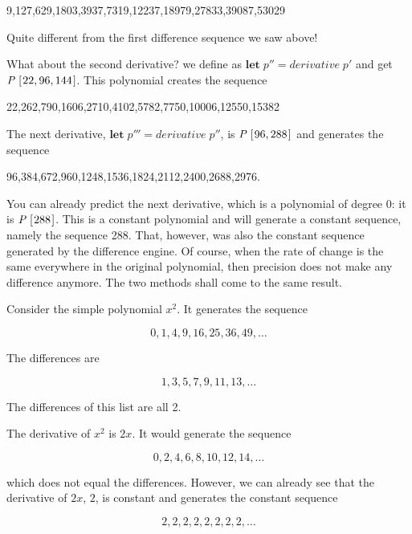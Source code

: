 \documentclass[tikz]{scrreprt}
\newcommand{\Conid}[1]{\mathit{#1}}
\newcommand{\Varid}[1]{\mathit{#1}}
\begin{document}
9,127,629,1803,3937,7319,12237,18979,27833,39087,53029

Quite different from the first difference sequence we saw above!

What about the second derivative? we define as
\ensuremath{\mathbf{let}\;\Varid{p''}\mathrel{=}\Varid{derivative}\;\Varid{p'}} and get \ensuremath{\Conid{P}\;[\mskip1.5mu \mathrm{22},\mathrm{96},\mathrm{144}\mskip1.5mu]}.
This polynomial creates the sequence

22,262,790,1606,2710,4102,5782,7750,10006,12550,15382

The next derivative, \ensuremath{\mathbf{let}\;\Varid{p'''}\mathrel{=}\Varid{derivative}\;\Varid{p''}},
is \ensuremath{\Conid{P}\;[\mskip1.5mu \mathrm{96},\mathrm{288}\mskip1.5mu]} and generates the sequence

96,384,672,960,1248,1536,1824,2112,2400,2688,2976.

You can already predict the next derivative,
which is a polynomial of degree 0: it is \ensuremath{\Conid{P}\;[\mskip1.5mu \mathrm{288}\mskip1.5mu]}.
This is a constant polynomial and will generate a constant
sequence, namely the sequence 288. That, however,
was also the constant sequence generated by the
difference engine. Of course, when the rate of change
is the same everywhere in the original polynomial,
then precision does not make any difference anymore.
The two methods shall come to the same result.

Consider the simple polynomial $x^2$.
It generates the sequence

\[
0,1,4,9,16,25,36,49,\dots
\]

The differences are

\[
1,3,5,7,9,11,13,\dots
\]

The differences of this list are all 2.

The derivative of $x^2$ is $2x$.
It would generate the sequence

\[
0,2,4,6,8,10,12,14,\dots
\]

which does not equal the differences.
However, we can already see that the derivative
of $2x$, $2$, is constant and generates the constant
sequence 

\[
2,2,2,2,2,2,2,2,\dots
\]
\end{document}
